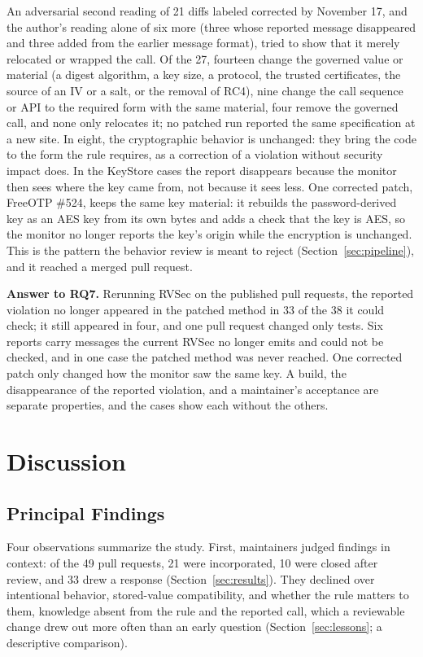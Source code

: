 \documentclass[conference]{IEEEtran}
\newcommand{\researchq}[1]{\textbf{RQ#1}}
\begin{document}
An adversarial second reading of 21 diffs labeled corrected by November 17,
and the author's reading alone of six more (three whose reported message
disappeared and three added from the earlier message format), tried to show
that it merely relocated or wrapped the call. Of the 27, fourteen change the
governed value or material (a digest algorithm, a key size, a protocol, the trusted
certificates, the source of an IV or a salt, or the removal of RC4), nine change the call sequence or API to the
required form with the same material, four remove the governed call, and none
only relocates it; no patched run reported the same specification at a new
site. In eight, the cryptographic behavior is unchanged: they bring the code to
the form the rule requires, as a correction of a violation without security
impact does. In the KeyStore cases the report disappears because the monitor
then sees where the key came from, not because it sees less. One corrected
patch, FreeOTP \#524, keeps the same key material: it rebuilds the
password-derived key as an AES key from its own bytes and adds a check that
the key is AES, so the monitor no longer reports the key's origin while the
encryption is unchanged. This is the pattern the behavior review is meant to
reject (Section~\ref{sec:pipeline}), and it reached a merged pull request.

\textbf{Answer to \researchq{7}.} Rerunning RVSec on the published pull
requests, the reported violation no longer appeared in the patched method in
33 of the 38 it could check; it still appeared in four, and one pull request
changed only tests. Six reports carry messages the current RVSec no longer
emits and could not be checked, and in one case the patched method was never
reached. One corrected patch only changed how the monitor saw the same key. A build, the disappearance of the reported violation, and a
maintainer's acceptance are separate properties, and the cases show each
without the others.

\section{Discussion}
\label{sec:discussion}

\subsection{Principal Findings}

Four observations summarize the study. First, maintainers judged findings in
context: of the 49 pull requests, 21 were incorporated, 10 were closed after
review, and 33 drew a response (Section~\ref{sec:results}). They declined over
intentional behavior, stored-value compatibility, and whether the rule matters
to them, knowledge absent from the rule and the reported call, which a
reviewable change drew out more often than an early question
(Section~\ref{sec:lessons}; a descriptive comparison).
\end{document}
